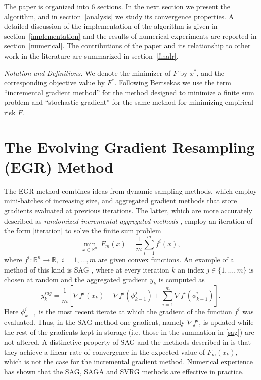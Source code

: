 \documentclass[11pt]{article}
\begin{document}
The paper is organized into 6 sections. In the next section we present the algorithm, and in section~\ref{analysis} we study its convergence properties. A detailed discussion of the implementation of the algorithm is given in section~\ref{implementation} and the results of numerical experiments are reported in  section~\ref{numerical}. The contributions of the paper and its relationship to other work in the literature are summarized in section~\ref{finalr}.

\bigskip\noindent
\textit{Notation and Definitions.}
We denote the minimizer of $F$ by $x^\ast$, and the corresponding objective value by $F^\ast$.  Following Bertsekas \cite{bertsekas2011incremental} we use the  term ``incremental gradient method''  for the method designed to minimize a finite sum problem and  ``stochastic gradient'' for the same method for minimizing empirical risk $F$.

\section{The Evolving Gradient Resampling (EGR) Method}
The EGR method combines ideas from dynamic sampling methods, which  employ mini-batches of increasing size, and  aggregated gradient methods that store gradients evaluated at previous iterations. The latter, which are more accurately described as \emph{randomized incremental aggregated methods}  \cite{roux2012stochastic,johnson2013accelerating,frostig2014competing,NIPS2014_5258}, employ an iteration of the form \eqref{iteration} to solve the finite sum problem
\begin{equation}
	\label{saa}
	\min_{x \in \mathbb{R}^n} \  F_m(x) = \frac{1}{m} \sum_{i =1}^m f^i(x),
\end{equation}
where $f^i: \mathbb{R}^n \rightarrow \mathbb{R},$ $i=1, \ldots, m$ are given convex functions. 
An example of a method of this kind is SAG \cite{roux2012stochastic}, where at every iteration $k$ an index $j \in \{1, \ldots, m\}$  is chosen at random and the aggregated gradient $y_k$ is computed as
\begin{equation}   \label{sag} 
     y_k^{sag}= \frac{1}{m} \left[ \nabla f^j(x_k) -  \nabla f^j(\phi_{k-1}^j) + \sum_{i=1}^{m}  \nabla f^i (\phi^i_{k-1}) \right].
     \end{equation}
Here $\phi^i_{k-1}$ is the most recent iterate at which the gradient of the function $f^i$ was evaluated. Thus, in the SAG method one gradient, namely  $\nabla f^j$,  is updated while the rest of the gradients kept in storage (i.e. those in the summation in \eqref{sag}) are not altered. A distinctive property of SAG  and the methods described in  \cite{johnson2013accelerating,NIPS2014_5258,shalev2013stochastic,mairal2015incremental,defazio2014finito} 
is that they achieve a linear rate of convergence in the expected value of $F_m(x_k)$, which is not the case for the incremental gradient method. Numerical experience has shown that the SAG, SAGA  and SVRG\cite{johnson2013accelerating} methods are effective in practice.
\end{document}
